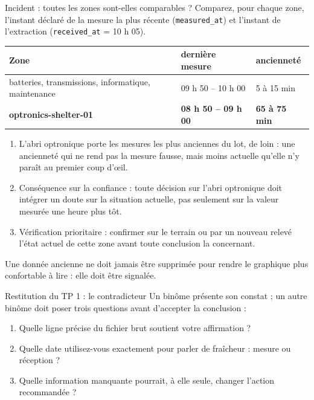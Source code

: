 \documentclass[aspectratio=169]{beamer}
\begin{document}
\begin{frame}{Incident : toutes les zones sont-elles comparables ?}
  \small
  Comparez, pour chaque zone, l'instant déclaré de la mesure la plus récente (\texttt{measured\_at}) et l'instant de l'extraction (\texttt{received\_at} = 10 h 05).
  \begin{center}
  \begin{tabular}{@{}p{}p{}p{}@{}}
    \toprule
    Zone & dernière mesure & ancienneté \\
    \midrule
    batteries, transmissions, informatique, maintenance & 09 h 50 -- 10 h 00 & 5 à 15 min \\[2pt]
    \textbf{optronics-shelter-01} & \textbf{08 h 50 -- 09 h 00} & \textbf{65 à 75 min} \\
    \bottomrule
  \end{tabular}
  \end{center}
  \begin{enumerate}
    \item L'abri optronique porte les mesures les plus anciennes du lot, de loin : une ancienneté qui ne rend pas la mesure fausse, mais moins actuelle qu'elle n'y paraît au premier coup d'œil.
    \item Conséquence sur la confiance : toute décision sur l'abri optronique doit intégrer un doute sur la situation actuelle, pas seulement sur la valeur mesurée une heure plus tôt.
    \item Vérification prioritaire : confirmer sur le terrain ou par un nouveau relevé l'état actuel de cette zone avant toute conclusion la concernant.
  \end{enumerate}
  \alert{Une donnée ancienne ne doit jamais être supprimée pour rendre le graphique plus confortable à lire : elle doit être signalée.}
\end{frame}

\begin{frame}{Restitution du TP 1 : le contradicteur}
  Un binôme présente son constat ; un autre binôme doit poser trois questions avant d'accepter la conclusion :
  \begin{enumerate}
    \item Quelle ligne précise du fichier brut soutient votre affirmation ?
    \item Quelle date utilisez-vous exactement pour parler de fraîcheur : mesure ou réception ?
    \item Quelle information manquante pourrait, à elle seule, changer l'action recommandée ?
  \end{enumerate}
  \vfill
\end{frame}
\end{document}

